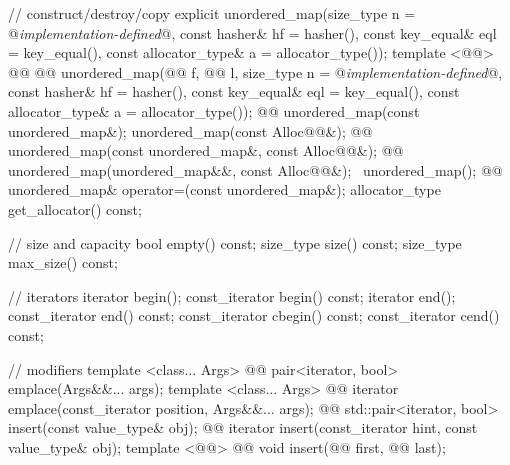 \documentclass[american,twoside]{book}
\begin{document}
\begin{codeblock}
{{    // construct/destroy/copy
    explicit unordered_map(size_type n = @\textit{implementation-defined}@,
                           const hasher& hf = hasher(),
                           const key_equal& eql = key_equal(),
                           const allocator_type& a = allocator_type());
    template <@@>
      @@
            @@
      unordered_map(@@ f, @@ l,
                    size_type n = @\textit{implementation-defined}@,
                    const hasher& hf = hasher(),
                    const key_equal& eql = key_equal(),
                    const allocator_type& a = allocator_type());
    @@ 
      unordered_map(const unordered_map&);
    unordered_map(const Alloc@@&);
    @@ 
      unordered_map(const unordered_map&, const Alloc@@&);
    @@
      unordered_map(unordered_map&&, const Alloc@@&);
    ~unordered_map();
    @@
      unordered_map& operator=(const unordered_map&);
    allocator_type get_allocator() const;

    // size and capacity
    bool empty() const;
    size_type size() const;
    size_type max_size() const;

    // iterators
    iterator       begin();
    const_iterator begin() const;
    iterator       end();
    const_iterator end() const;
    const_iterator cbegin() const;
    const_iterator cend() const;

    // modifiers
    template <class... Args> 
      @@
      pair<iterator, bool> emplace(Args&&... args);
    template <class... Args> 
      @@
      iterator emplace(const_iterator position, Args&&... args);
    @@
      std::pair<iterator, bool> insert(const value_type& obj);
    @@
      iterator insert(const_iterator hint, const value_type& obj);
    template <@@> 
      @@
      void insert(@@ first, @@ last);

}}
\end{codeblock}
\end{document}
